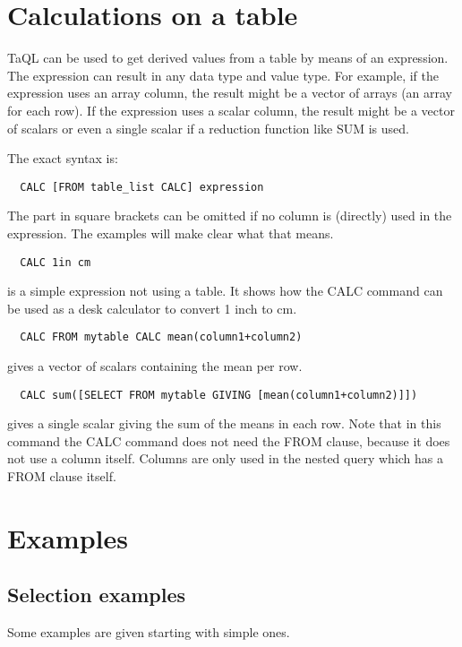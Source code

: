 \section{\label{TAQL:CALCULATING}Calculations on a table}
TaQL can be used to get derived values from a table by means of an
expression. The expression can result in any data type and value type.
For example, if the expression uses an array column, the result might
be a vector of arrays (an array for each row). If the expression uses
a scalar column, the result might be a vector of scalars or even a
single scalar if a reduction function like SUM is used.

The exact syntax is:
\begin{verbatim}
  CALC [FROM table_list CALC] expression
\end{verbatim}
The part in square brackets can be omitted if no column is (directly)
used in the expression. The examples will make clear what that means.

\begin{verbatim}
  CALC 1in cm
\end{verbatim}
is a simple expression not using a table. It shows how the CALC
command can be used as a desk calculator to convert 1 inch to cm.

\begin{verbatim}
  CALC FROM mytable CALC mean(column1+column2)
\end{verbatim}
gives a vector of scalars containing the mean per row.

\begin{verbatim}
  CALC sum([SELECT FROM mytable GIVING [mean(column1+column2)]])
\end{verbatim}
gives a single scalar giving the sum of the means in each row.
Note that in this command the CALC command does not need the FROM
clause, because it does not use a column itself. Columns are only
used in the nested query which has a FROM clause itself.

\section{Examples}
\subsection{\label{TAQL:SELEXAMPLES}Selection examples}
Some examples are given starting with simple ones.
